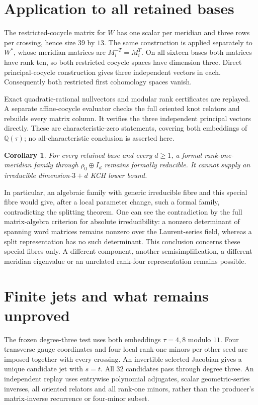 \documentclass[11pt]{article}
\newtheorem{corollary}[theorem]{Corollary}
\begin{document}
\section{Application to all retained bases}

The restricted-cocycle matrix for $W$ has one scalar per meridian
and three rows per crossing, hence size $39$ by $13$. The same
construction is applied separately to $W^*$, whose meridian matrices
are $M_i^{-T}=M_i^T$. On all sixteen bases both matrices have rank
ten, so both restricted cocycle spaces have dimension three.
Direct principal-cocycle construction gives three independent
vectors in each. Consequently both restricted first cohomology
spaces vanish.

Exact quadratic-rational nullvectors and modular rank certificates
are replayed. A separate affine-cocycle evaluator checks the full
oriented knot relators and rebuilds every matrix column. It verifies
the three independent principal vectors directly. These are
characteristic-zero statements, covering both embeddings of
$\mathbb Q(\tau)$; no all-characteristic conclusion is asserted here.

\begin{corollary}
For every retained base and every $d\ge1$, a formal rank-one-meridian
family through $\rho_0\oplus I_d$ remains formally reducible.
It cannot supply an irreducible dimension-$3+d$ KCH lower bound.
\end{corollary}

In particular, an algebraic family with generic irreducible fibre
and this special fibre would give, after a local parameter change,
such a formal family, contradicting the splitting theorem. One can
see the contradiction by the full matrix-algebra criterion for
absolute irreducibility: a nonzero determinant of spanning word
matrices remains nonzero over the Laurent-series field, whereas a
split representation has no such determinant. This conclusion
concerns these special fibres only. A different component, another
semisimplification, a different meridian eigenvalue or an unrelated
rank-four representation remains possible.

\section{Finite jets and what remains unproved}

The frozen degree-three test uses both embeddings $\tau=4,8$
modulo $11$. Four transverse gauge coordinates and four local
rank-one minors per other seed are imposed together with every
crossing. An invertible selected Jacobian gives a unique candidate
jet with $s=t$. All $32$ candidates pass through degree three.
An independent replay uses entrywise polynomial adjugates, scalar
geometric-series inverses, all oriented relators and all rank-one
minors, rather than the producer's matrix-inverse recurrence or
four-minor subset.
\end{document}
